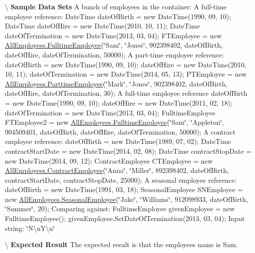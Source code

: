 \textbackslash{} {\bfseries  Sample Data Sets} A bunch of employees in the container\+: A full-\/time employee reference\+: Date\+Time date\+Of\+Birth = new Date\+Time(1990, 09, 10); Date\+Time date\+Of\+Hire = new Date\+Time(2010, 10, 11); Date\+Time date\+Of\+Termination = new Date\+Time(2013, 03, 04); F\+T\+Employee = new \hyperlink{class_all_employees_1_1_fulltime_employee}{All\+Employees.\+Fulltime\+Employee}(\char`\"{}\+Sam\char`\"{}, \char`\"{}\+Jones\char`\"{}, 902398402, date\+Of\+Birth, date\+Of\+Hire, date\+Of\+Termination, 50000); A part-\/time employee reference\+: date\+Of\+Birth = new Date\+Time(1990, 09, 10); date\+Of\+Hire = new Date\+Time(2010, 10, 11); date\+Of\+Termination = new Date\+Time(2014, 05, 13); P\+T\+Employee = new \hyperlink{class_all_employees_1_1_parttime_employee}{All\+Employees.\+Parttime\+Employee}(\char`\"{}\+Mark\char`\"{}, \char`\"{}\+Jones\char`\"{}, 902398402, date\+Of\+Birth, date\+Of\+Hire, date\+Of\+Termination, 30); A full-\/time employee reference date\+Of\+Birth = new Date\+Time(1990, 09, 10); date\+Of\+Hire = new Date\+Time(2011, 02, 18); date\+Of\+Termination = new Date\+Time(2013, 03, 04); Fulltime\+Employee F\+T\+Employee2 = new \hyperlink{class_all_employees_1_1_fulltime_employee}{All\+Employees.\+Fulltime\+Employee}(\char`\"{}\+Sam\char`\"{}, \char`\"{}\+Appleton\char`\"{}, 904509401, date\+Of\+Birth, date\+Of\+Hire, date\+Of\+Termination, 50000); A contract employee reference\+: date\+Of\+Birth = new Date\+Time(1989, 07, 02); Date\+Time contract\+Start\+Date = new Date\+Time(2014, 02, 08); Date\+Time contract\+Stop\+Date = new Date\+Time(2014, 09, 12); Contract\+Employee C\+T\+Employee = new \hyperlink{class_all_employees_1_1_contract_employee}{All\+Employees.\+Contract\+Employee}(\char`\"{}\+Anna\char`\"{}, \char`\"{}\+Miller\char`\"{}, 892398402, date\+Of\+Birth, contract\+Start\+Date, contract\+Stop\+Date, 25000); A seasonal employee reference\+: date\+Of\+Birth = new Date\+Time(1991, 03, 18); Seasonal\+Employee S\+N\+Employee = new \hyperlink{class_all_employees_1_1_seasonal_employee}{All\+Employees.\+Seasonal\+Employee}(\char`\"{}\+Jake\char`\"{}, \char`\"{}\+Williams\char`\"{}, 912098933, date\+Of\+Birth, \char`\"{}\+Summer\char`\"{}, 20); Comparing against\+: Fulltime\+Employee given\+Employee = new Fulltime\+Employee(); given\+Employee.\+Set\+Date\+Of\+Termination(2013, 03, 04); Input string\+: \char`\"{}\+N\textbackslash{}n\+Y\textbackslash{}n\char`\"{}

\textbackslash{} {\bfseries  Expected Result} The expected result is that the employee\textquotesingle{}s name is Sam.

